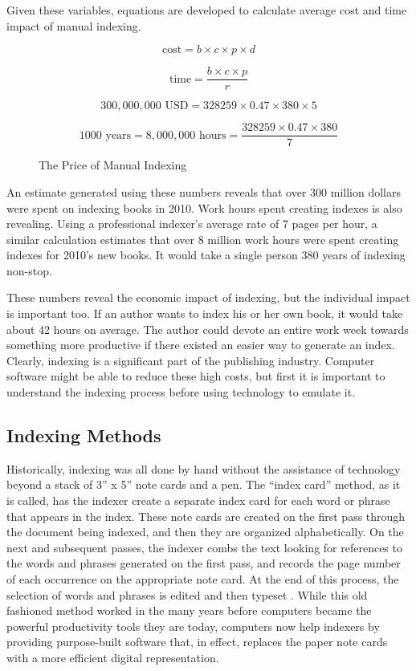 Given these variables, equations are developed to calculate average cost and time impact of manual indexing.

\begin{figure}[H]
$$ \text{cost} = b \times c \times p \times d $$

$$ \text{time} = \frac{b \times c \times p}{r} $$

$$ 300,000,000 \text{ USD} = 328259 \times 0.47 \times 380 \times 5 $$

$$ 1000 \text{ years} = 8,000,000 \text{ hours} = \frac{328259 \times 0.47 \times 380}{7}$$
\caption{The Price of Manual Indexing}
\end{figure}

An estimate generated using these numbers reveals that over 300 million dollars were spent on indexing books in 2010. Work hours spent creating indexes is also revealing.
Using a professional indexer's average rate of 7 pages per hour, a similar calculation estimates that over 8 million work hours were spent creating indexes for 2010's new books. It would take a single person 380 years of indexing non-stop.

These numbers reveal the economic impact of indexing, but the individual impact is important too.
If an author wants to index his or her own book, it would take about 42 hours on average. The author could devote an entire work week towards something more productive if there existed an easier way to generate an index.
Clearly, indexing is a significant part of the publishing industry.
Computer software might be able to reduce these high costs, but first it is important to understand the indexing process before using technology to emulate it.

\subsection{Indexing Methods}
\label{sec:indexing-methods}

Historically, indexing was all done by hand without the assistance of technology beyond a stack of 3'' x 5'' note cards and a pen.
The ``index card'' method, as it is called, has the indexer create a separate index card for each word or phrase that appears in the index.
These note cards are created on the first pass through the document being indexed, and then they are organized alphabetically.
On the next and subsequent passes, the indexer combs the text looking for references to the words and phrases generated on the first pass, and records the page number of each occurrence on the appropriate note card.
At the end of this process, the selection of words and phrases is edited and then typeset \cite{mulvany}.
While this old fashioned method worked in the many years before computers became the powerful productivity tools they are today, computers now help indexers by providing purpose-built software that, in effect, replaces the paper note cards with a more efficient digital representation.

